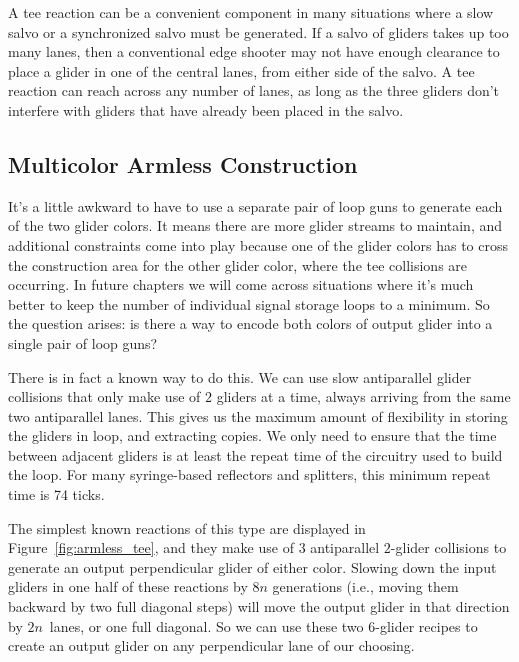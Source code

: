 
A tee reaction can be a convenient component in many situations where a slow salvo or a synchronized salvo must be generated. If a salvo of gliders takes up too many lanes, then a conventional edge shooter may not have enough clearance to place a glider in one of the central lanes, from either side of the salvo. A tee reaction can reach across any number of lanes, as long as the three gliders don't interfere with gliders that have already been placed in the salvo.

\subsection{Multicolor Armless Construction}\label{sec:multicolor_armless}
It's a little awkward to have to use a separate pair of loop guns to generate each of the two glider colors. It means there are more glider streams to maintain, and additional constraints come into play because one of the glider colors has to cross the construction area for the other glider color, where the tee collisions are occurring. In future chapters we will come across situations where it's much better to keep the number of individual signal storage loops to a minimum.  So the question arises:  is there a way to encode both colors of output glider into a single pair of loop guns?

There is in fact a known way to do this. We can use slow antiparallel glider collisions that only make use of $2$ gliders at a time, always arriving from the same two antiparallel lanes. This gives us the maximum amount of flexibility in storing the gliders in loop, and extracting copies. We only need to ensure that the time between adjacent gliders is at least the repeat time of the circuitry used to build the loop. For many syringe-based reflectors and splitters, this minimum repeat time is 74 ticks.

The simplest known reactions of this type are displayed in Figure~\ref{fig:armless_tee}, and they make use of $3$ antiparallel $2$-glider collisions to generate an output perpendicular glider of either color. Slowing down the input gliders in one half of these reactions by $8n$ generations (i.e., moving them backward by two full diagonal steps) will move the output glider in that direction by $2n$~lanes, or one full diagonal. So we can use these two $6$-glider recipes to create an output glider on any perpendicular lane of our choosing.

